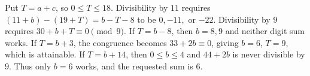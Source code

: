 Put $T=a+c$, so $0\le T\le18$. Divisibility by $11$ requires $(11+b)-(19+T)=b-T-8$ to be $0,-11,$ or $-22$. Divisibility by $9$ requires $30+b+T\equiv0\pmod9$. If $T=b-8$, then $b=8,9$ and neither digit sum works. If $T=b+3$, the congruence becomes $33+2b\equiv0$, giving $b=6$, $T=9$, which is attainable. If $T=b+14$, then $0\le b\le4$ and $44+2b$ is never divisible by $9$. Thus only $b=6$ works, and the requested sum is $\boxed6$.
